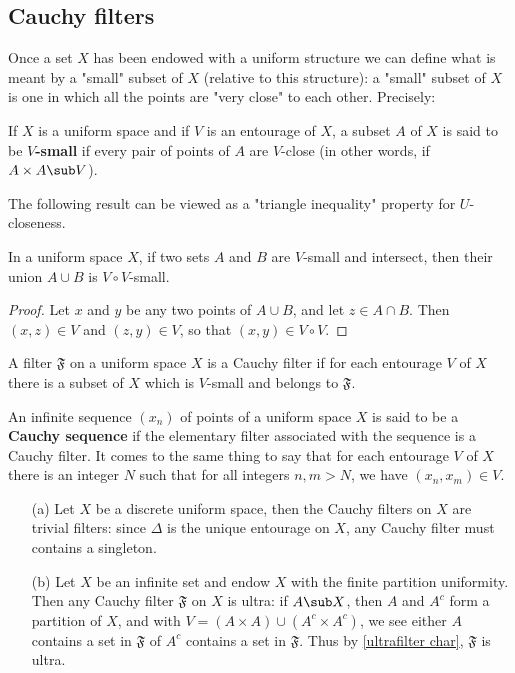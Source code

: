 \subsection{Cauchy filters}
Once a set $X$ has been endowed with a uniform structure we can define what is meant by a "small" subset of $X$ (relative to this structure): a "small" subset of $X$ is one in which all the points are "very close" to each other. Precisely:
\begin{definition}
If $X$ is a uniform space and if $V$ is an entourage of $X$, a subset $A$ of $X$ is said to be \textbf{$V$-small} if every pair of points of $A$ are $V$-close (in other words, if $A\times A\sub V$).
\end{definition}
The following result can be viewed as a "triangle inequality" property for $U$-closeness.
\begin{proposition}\label{uniform space union smallness}
In a uniform space $X$, if two sets $A$ and $B$ are $V$-small and intersect, then their union $A\cup B$ is $V\circ V$-small.
\end{proposition}
\begin{proof}
Let $x$ and $y$ be any two points of $A\cup B$, and let $z\in A\cap B$. Then $(x,z)\in V$ and $(z,y)\in V$, so that $(x,y)\in V\circ V$.
\end{proof}
A filter $\mathfrak{F}$ on a uniform space $X$ is a Cauchy filter if for each entourage $V$ of $X$ there is a subset of $X$ which is $V$-small and belongs to $\mathfrak{F}$.
\begin{remark}
An infinite sequence $(x_n)$ of points of a uniform space $X$ is said to be a \textbf{Cauchy sequence} if the elementary filter associated with the sequence is a Cauchy filter. It comes to the same thing to say that for each entourage $V$ of $X$ there is an integer $N$ such that for all integers $n,m>N$, we have $(x_n,x_m)\in V$.
\end{remark}
\begin{example}
\mbox{}
\begin{itemize}
\item[(a)] Let $X$ be a discrete uniform space, then the Cauchy filters on $X$ are trivial filters: since $\Delta$ is the unique entourage on $X$, any Cauchy filter must contains a singleton.
\item[(b)] Let $X$ be an infinite set and endow $X$ with the finite partition uniformity. Then any Cauchy filter $\mathfrak{F}$ on $X$ is ultra: if $A\sub X$, then $A$ and $A^c$ form a partition of $X$, and with $V=(A\times A)\cup(A^c\times A^c)$, we see either $A$ contains a set in $\mathfrak{F}$ of $A^c$ contains a set in $\mathfrak{F}$. Thus by \cref{ultrafilter char}, $\mathfrak{F}$ is ultra.
\end{itemize}
\end{example}
